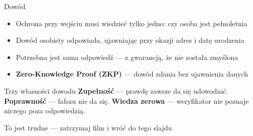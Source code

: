 \begin{frame}{Dowód}
  \begin{itemize}
    \item Ochrona przy wejściu musi wiedzieć tylko jedno: czy osoba jest pełnoletnia
    \item Dowód osobisty odpowiada, ujawniając przy okazji adres i datę urodzenia
    \item Potrzebna jest sama odpowiedź --- z gwarancją, że nie została zmyślona
    \item \textbf{Zero-Knowledge Proof (ZKP)} --- dowód zdania bez ujawnienia danych
  \end{itemize}
  \vspace{0.15cm}
  \begin{block}{Trzy własności dowodu}
    \textbf{Zupełność} --- prawdę zawsze da się udowodnić.
    \textbf{Poprawność} --- fałszu nie da się.
    \textbf{Wiedza zerowa} --- weryfikator nie poznaje niczego poza odpowiedzią.
  \end{block}
  \vspace{0.1cm}
  \begin{center}
    \textcolor{stplmuted}{\small To jest trudne --- zatrzymaj film i wróć do tego slajdu}
  \end{center}
\end{frame}

